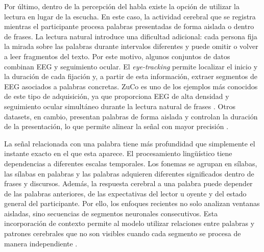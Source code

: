 Por último, dentro de la percepción del habla existe la opción de utilizar la lectura en lugar de la escucha. En este caso, la actividad cerebral que se registra mientras el participante procesa palabras presentadas de forma aislada o dentro de frases. La lectura natural introduce una dificultad adicional: cada persona fija la mirada sobre las palabras durante intervalos diferentes y puede omitir o volver a leer fragmentos del texto. Por este motivo, algunos conjuntos de datos combinan EEG y seguimiento ocular. El \textit{eye-tracking} permite localizar el inicio y la duración de cada fijación y, a partir de esta información, extraer segmentos de EEG asociados a palabras concretas. ZuCo es uno de los ejemplos más conocidos de este tipo de adquisición, ya que proporciona EEG de alta densidad y seguimiento ocular simultáneo durante la lectura natural de frases \cite{hollenstein2020zuco2}. Otros datasets, en cambio, presentan palabras de forma aislada y controlan la duración de la presentación, lo que permite alinear la señal con mayor precisión \cite{panachakel2021covert,alzahrani2024systematic}.

La señal relacionada con una palabra tiene más profundidad que simplemente el instante exacto en el que esta aparece. El procesamiento lingüístico tiene dependencias a diferentes escalas temporales. Los fonemas se agrupan en sílabas, las sílabas en palabras y las palabras adquieren diferentes significados dentro de frases y discursos. Además, la respuesta cerebral a una palabra puede depender de las palabras anteriores, de las expectativas del lector u oyente y del estado general del participante. Por ello, los enfoques recientes no solo analizan ventanas aisladas, sino secuencias de segmentos neuronales consecutivos. Esta incorporación de contexto permite al modelo utilizar relaciones entre palabras y patrones cerebrales que no son visibles cuando cada segmento se procesa de manera independiente \cite{dascoli2024words,jayalath2026megxl}.

